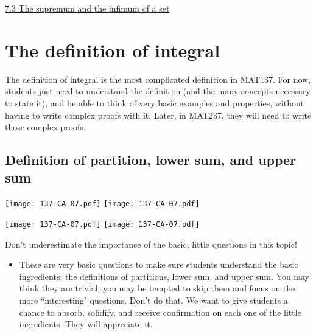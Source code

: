 \documentclass[11pt]{article}
\newcommand{\nl}{\hfill \vspace{-1.1\baselineskip}} %
\newcommand{\viii}{\hspace{8mm} \href{https://www.youtube.com/watch?v=4qNstDwlh9I&list=PLlwePzQY_wW9vqCkUudCmoOvnNmr9vMuJ&index=3}{7.3 The supremum and the infimum of a set}}
\begin{document}
\begin{videos}
\viii
\end{videos}

\newpage
\section{The definition of integral}
\vspace{5mm}

The definition of integral is the most complicated definition in MAT137.  For now, students just need to understand the definition (and the many concepts necessary to state it), and be able to think of very basic examples and properties, without having to write complex proofs with it.  Later, in MAT237, they will need to write those complex proofs.


\vspace{5mm}
\subsection{Definition of partition, lower sum, and upper sum}

\begin{center}
{ \texttt{[image: 137-CA-07.pdf]}} \quad
{ \texttt{[image: 137-CA-07.pdf]}} 

{ \texttt{[image: 137-CA-07.pdf]}} \quad
{ \texttt{[image: 137-CA-07.pdf]}} 
\end{center}

\vspace{-4mm}


\begin{warning}
Don't underestimate the importance of the basic, little questions in this topic!
\end{warning}


\begin{comments}
\nl
	\begin{itemize}
		\item These are very basic questions to make sure students understand the basic ingredients: the definitions of partitions, lower sum, and upper sum.  You may think they are trivial; you may be tempted to skip them and focus on the more ``interesting" questions.  Don't do that.    We want to give students a chance to absorb, solidify, and receive confirmation on each one of the little ingredients.  They will appreciate it.
	\end{itemize}
\end{comments}
\end{document}
